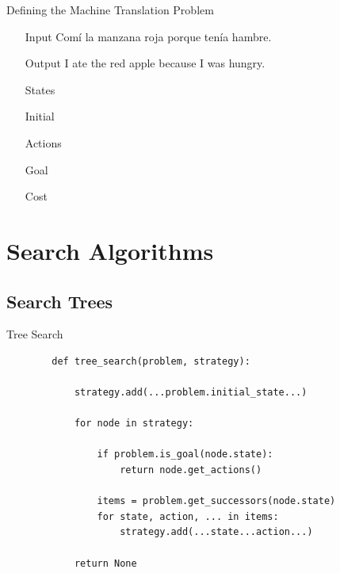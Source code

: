 \documentclass[14pt]{beamer}
\begin{document}
\begin{frame}{Defining the Machine Translation Problem}
	\begin{itemize}
		\item[Input] Com\'i la manzana roja porque ten\'ia hambre.
		\item[Output] I ate the red apple because I was hungry.
		\bigskip\bigskip
		\item[States]
		\item[Initial]
		\item[Actions]
		\item[Goal]
		\item[Cost]
	\end{itemize}
\end{frame}

\section{Search Algorithms}

\subsection{Search Trees}

\begin{frame}[fragile]{Tree Search}
	\footnotesize
	\begin{lstlisting}
		def tree_search(problem, strategy):

		    strategy.add(...problem.initial_state...)

		    for node in strategy:

		        if problem.is_goal(node.state):
		            return node.get_actions()

		        items = problem.get_successors(node.state)
		        for state, action, ... in items:
		            strategy.add(...state...action...)

		    return None
	\end{lstlisting}
\end{frame}
\end{document}
